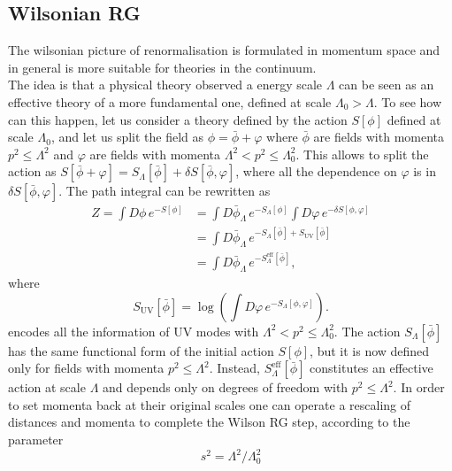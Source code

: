 \subsection{Wilsonian RG}
\label{sec:wilson_rg}
The wilsonian picture of renormalisation \cite{WilsonRG1,WilsonRG2} is formulated in momentum space and in general is more suitable for theories in the continuum.\\
The idea is that a physical theory observed a energy scale $\Lambda$ can be seen as an effective theory of a more fundamental one, defined at scale $\Lambda_0 > \Lambda$. To see how can this happen, let us consider a theory defined by the action $S[\phi]$ defined at scale $\Lambda_0$, and let us split the field as $\phi = \bar\phi + \varphi$ where $\bar\phi$ are fields with momenta $p^2 \leq \Lambda^2$ and $\varphi$ are fields with momenta $\Lambda^2 < p^2 \leq \Lambda_0^{2}$. This allows 
to split the action as $S[\bar\phi + \varphi] = S_{\Lambda}[\bar\phi] + \delta S[\bar\phi, \varphi]$, where all the dependence on $\varphi$ is in $\delta S[\bar\phi, \varphi]$. The path integral can be rewritten as
\begin{equation*}
    \begin{aligned}
        Z = \int D\phi \, e^{-S[\phi]} &= \int D\bar\phi_{\Lambda} \, e^{-S_{\Lambda}[\phi]} \int D\varphi  \, e^{-\delta S[\phi, \varphi]}  \\
        &= \int D\bar\phi_{\Lambda} \, e^{-S_{\Lambda}[\bar\phi] + S_\text{UV}[\bar\phi]}\\
        &= \int D\bar\phi_{\Lambda} \, e^{-S_{\Lambda}^\text{eff}[\bar\phi]},
    \end{aligned}
\end{equation*}
where 
\begin{equation*}
    S_\text{UV}[\bar\phi] = \log\left( \int D\varphi \, e^{-S_{\Lambda}[\phi, \varphi]}\right).
\end{equation*}
encodes all the information of UV modes with $\Lambda^2 < p^2 \leq \Lambda_0^2$. The action $S_{\Lambda}[\bar\phi]$ has the same functional form of the initial action $S[\phi]$, but it is now defined only for fields with momenta $p^2 \leq \Lambda^{2}$. Instead, $S^\text{eff}_\Lambda[\bar\phi]$ constitutes an effective action at scale $\Lambda$ and depends only on degrees of freedom with $p^2 \leq \Lambda^2$.
In order to set momenta back at their original scales one can operate a rescaling of distances and momenta to complete the Wilson RG step, according to the parameter 
\begin{equation*}
    s^2 = \Lambda^2 / \Lambda_0^2
\end{equation*}
